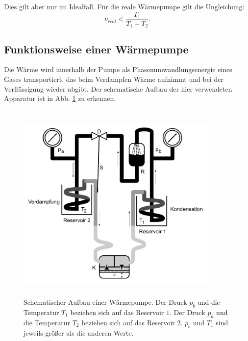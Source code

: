 \noindent Dies gilt aber nur im Idealfall. Für die reale Wärmepumpe gilt die 
Ungleichung:
\begin{equation*}
    \nu_{real} < \frac{T_1}{T_1-T_2}.
\end{equation*}

\subsection{Funktionsweise einer Wärmepumpe}
Die Wärme wird innerhalb der Pumpe als Phasenumwandlungsenergie eines Gases 
transportiert, das beim Verdampfen Wärme aufnimmt und bei der Verflüssigung wieder 
abgibt. Der schematische Aufbau der hier verwendeten Apparatur ist in Abb. \ref{fig:aufbau1} zu 
erkennen.
\begin{figure}
    \centering
    \includegraphics[width=10cm, height=10cm]{build/1.png}
    \caption{Schematischer Aufbau einer Wärmepumpe. Der Druck $p_b$ und die Temperatur
    $T_1$ beziehen sich auf das Reservoir $\num{1}$. Der Druck $p_a$ und die Temperatur
    $T_2$ beziehen sich auf das Reservoir $\num{2}$. $p_b$ und $T_1$ sind jeweils
    größer als die anderen Werte.} %
    \label{fig:aufbau1}
\end{figure}

